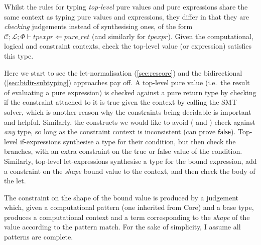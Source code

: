 Whilst the rules for typing \emph{top-level} pure values and pure expressions
share the same context as typing pure values and expressions, they differ in
that they are \emph{checking} judgements instead of synthesising ones, of the
form $\mathcal{C}; \mathcal{L}; \Phi \vdash \mathit{tpexpr} \Leftarrow
\mathit{pure\_ret}$ (and similarly for $\mathit{tpexpr}$). Given the
computational, logical and constraint contexts, check the top-level value (or
expression) satisfies this type.

Here we start to see the let-normalisation (\cref{sec:rescore}) and the
bidirectional (\cref{sec:bidir-subtyping}) approaches pay off. A top-level pure
value (i.e.\ the result of evaluating a pure expression) is checked against a
pure return type by checking if the constraint attached to it is true given the
context by calling the SMT solver, which is another reason why the constraints
being decidable is important and helpful. Similarly, the constructs we would
like to avoid ( and ) check against %
\emph{any} type, so long as the constraint context is inconsistent (can prove
$\mathsf{false}$). Top-level if-expressions synthesise a type for their condition,
but then check the branches, with an extra constraint on the true or false
value of the condition. Similarly, top-level let-expressions synthesise a type
for the bound expression, add a constraint on the \emph{shape} bound value to
the context, and then check the body of the let.

The constraint on the shape of the bound value is produced by a judgement which,
given a computational pattern (one inherited from Core) and a base type,
produces a computational context and a term corresponding to the \emph{shape}
of the value according to the pattern match. For the sake of simplicity, I
assume all patterns are complete.

